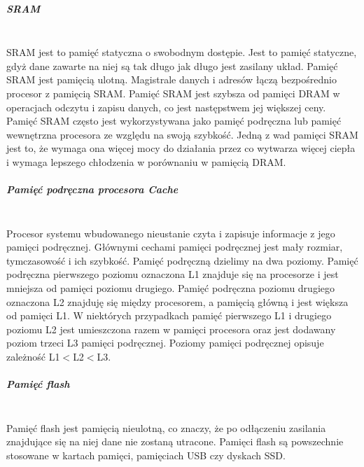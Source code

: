 \documentclass[12p]{article}
\begin{document}
\subparagraph{SRAM} \mbox{} \\

SRAM jest to pamięć statyczna o swobodnym dostępie. Jest to pamięć statyczne, gdyż dane zawarte na niej są tak długo jak długo jest zasilany układ. Pamięć SRAM jest pamięcią ulotną. Magistrale danych i adresów łączą bezpośrednio procesor z pamięcią SRAM. Pamięć SRAM jest szybsza od pamięci DRAM w operacjach odczytu i zapisu danych, co jest następstwem jej większej ceny. Pamięć SRAM często jest wykorzystywana jako pamięć podręczna lub pamięć wewnętrzna procesora ze względu na swoją szybkość. Jedną z wad pamięci SRAM jest to, że wymaga ona więcej mocy do działania przez co wytwarza więcej ciepła i wymaga lepszego chłodzenia w porównaniu w pamięcią DRAM. %

\subparagraph{Pamięć podręczna procesora Cache} \mbox{} \\

Procesor systemu wbudowanego nieustanie czyta i zapisuje informacje z jego pamięci podręcznej. Głównymi cechami pamięci podręcznej jest mały rozmiar, tymczasowość i ich szybkość. Pamięć podręczną dzielimy na dwa poziomy. Pamięć podręczna pierwszego poziomu oznaczona L1 znajduje się na procesorze i jest mniejsza od pamięci poziomu drugiego. Pamięć podręczna poziomu drugiego oznaczona L2 znajduję się między procesorem, a pamięcią główną i jest większa od pamięci L1. W niektórych przypadkach pamięć pierwszego L1 i drugiego poziomu L2 jest umieszczona razem w pamięci procesora oraz jest dodawany poziom trzeci L3 pamięci podręcznej. Poziomy pamięci podręcznej opisuje zależność L1$<$L2$<$L3. 

\subparagraph{Pamięć flash} \mbox{} \\

Pamięć flash jest pamięcią nieulotną, co znaczy, że po odłączeniu zasilania znajdujące się na niej dane nie zostaną utracone. Pamięci flash są powszechnie stosowane w kartach pamięci, pamięciach USB czy dyskach SSD.

\end{document}

